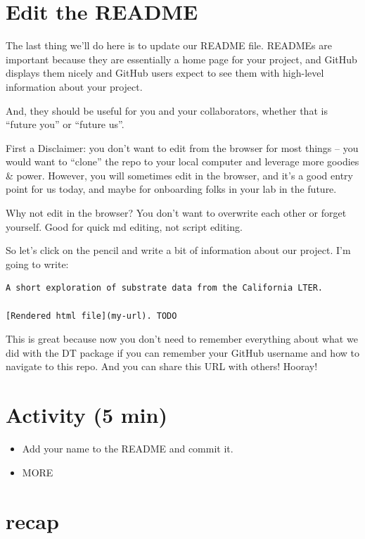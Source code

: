 \documentclass[]{book}
\providecommand{\tightlist}{%
  \setlength{\itemsep}{0pt}\setlength{\parskip}{0pt}}
\begin{document}
\hypertarget{edit-the-readme}{%
\section{Edit the README}\label{edit-the-readme}}

The last thing we'll do here is to update our README file. READMEs are important because they are essentially a home page for your project, and GitHub displays them nicely and GitHub users expect to see them with high-level information about your project.

And, they should be useful for you and your collaborators, whether that is ``future you'' or ``future us''.

First a Disclaimer: you don't want to edit from the browser for most things -- you would want to ``clone'' the repo to your local computer and leverage more goodies \& power. However, you will sometimes edit in the browser, and it's a good entry point for us today, and maybe for onboarding folks in your lab in the future.

Why not edit in the browser? You don't want to overwrite each other or forget yourself. Good for quick md editing, not script editing.

So let's click on the pencil and write a bit of information about our project. I'm going to write:

\begin{verbatim}
A short exploration of substrate data from the California LTER. 

[Rendered html file](my-url). TODO
\end{verbatim}

This is great because now you don't need to remember everything about what we did with the DT package if you can remember your GitHub username and how to navigate to this repo. And you can share this URL with others! Hooray!

\hypertarget{activity-5-min-1}{%
\section{Activity (5 min)}\label{activity-5-min-1}}

\begin{itemize}
\tightlist
\item
  Add your name to the README and commit it.
\item
  MORE
\end{itemize}

\hypertarget{recap}{%
\section{recap}\label{recap}}
\end{document}
